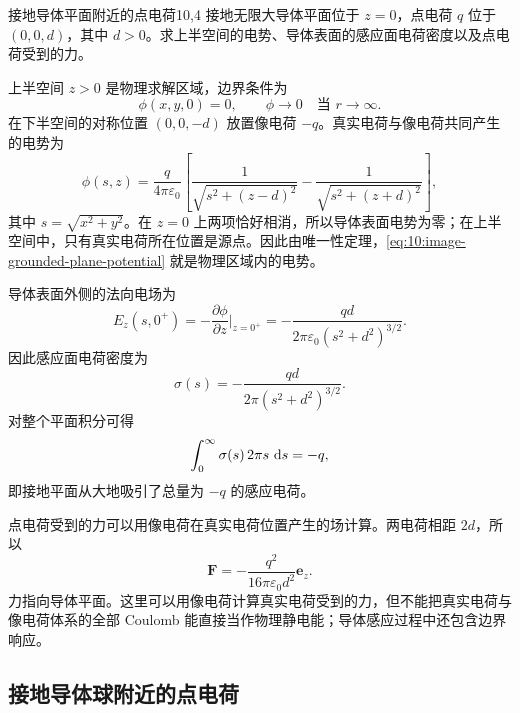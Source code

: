 \begin{example}{接地导体平面附近的点电荷}{10,4}
接地无限大导体平面位于 $z=0$，点电荷 $q$ 位于
$(0,0,d)$，其中 $d>0$。求上半空间的电势、导体表面的感应面电荷密度以及点电荷受到的力。

\begin{solution}
上半空间 $z>0$ 是物理求解区域，边界条件为
\[
\phi(x,y,0)=0,
\qquad
\phi\to 0
\quad
\text{当 }r\to\infty.
\]
在下半空间的对称位置 $(0,0,-d)$ 放置像电荷 $-q$。真实电荷与像电荷共同产生的电势为
\begin{equation}
	\phi(s,z)
	=
	\frac{q}{4\pi\varepsilon_{0}}
	\left[
	\frac{1}{\sqrt{s^{2}+(z-d)^{2}}}
	-
	\frac{1}{\sqrt{s^{2}+(z+d)^{2}}}
	\right],
	\label{eq:10:image-grounded-plane-potential}
\end{equation}
其中 $s=\sqrt{x^{2}+y^{2}}$。在 $z=0$ 上两项恰好相消，所以导体表面电势为零；在上半空间中，只有真实电荷所在位置是源点。因此由唯一性定理，\eqref{eq:10:image-grounded-plane-potential} 就是物理区域内的电势。

导体表面外侧的法向电场为
\[
E_{z}(s,0^{+})
=
-\frac{\partial\phi}{\partial z}\bigg|_{z=0^{+}}
=
-\frac{qd}{2\pi\varepsilon_{0}(s^{2}+d^{2})^{3/2}}.
\]
因此感应面电荷密度为
\begin{equation}
	\sigma(s)
	=
	-\frac{qd}{2\pi(s^{2}+d^{2})^{3/2}}.
	\label{eq:10:image-grounded-plane-sigma}
\end{equation}
对整个平面积分可得
\[
\int_{0}^{\infty}\sigma(s)\,2\pi s\,\mathop{}\!\mathrm{d} s=-q,
\]
即接地平面从大地吸引了总量为 $-q$ 的感应电荷。

点电荷受到的力可以用像电荷在真实电荷位置产生的场计算。两电荷相距 $2d$，所以
\[
\bm{F}
=
-\frac{q^{2}}{16\pi\varepsilon_{0}d^{2}}\bm{e}_{z}.
\]
力指向导体平面。这里可以用像电荷计算真实电荷受到的力，但不能把真实电荷与像电荷体系的全部 Coulomb 能直接当作物理静电能；导体感应过程中还包含边界响应。
\end{solution}
\end{example}

\subsection{接地导体球附近的点电荷}

